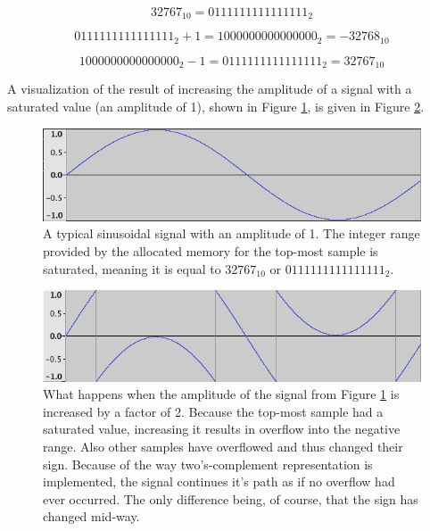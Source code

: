 \documentclass[12pt]{report}
\begin{document}
$$32767_{10} = 0111111111111111_{2}$$

$$0111111111111111_{2} + 1 = 1000000000000000_{2} = -32768_{10}$$

$$1000000000000000_{2} - 1 = 0111111111111111_{2} = 32767_{10}$$

A visualization of the result of increasing the amplitude of a signal with a saturated value (an amplitude of 1), shown in Figure \ref{fig:no-over}, is given in Figure \ref{fig:over}.

\begin{figure}[p]

  \centering

  \includegraphics[scale=0.5]{img/no-over}

  \caption{A typical sinusoidal signal with an amplitude of 1. The integer range provided by the allocated memory for the top-most sample is saturated, meaning it is equal to $32767_{10}$ or $0111111111111111_{2}$.}

  \label{fig:no-over}

\end{figure}

\begin{figure}[p]

  \centering

  \includegraphics[scale=0.5]{img/over}

  \caption{What happens when the amplitude of the signal from Figure \ref{fig:no-over} is increased by a factor of 2. Because the top-most sample had a saturated value, increasing it results in overflow into the negative range. Also other samples have overflowed and thus changed their sign. Because of the way two's-complement representation is implemented, the signal continues it's path as if no overflow had ever occurred. The only difference being, of course, that the sign has changed mid-way.}

  \label{fig:over}

\end{figure}
\end{document}
